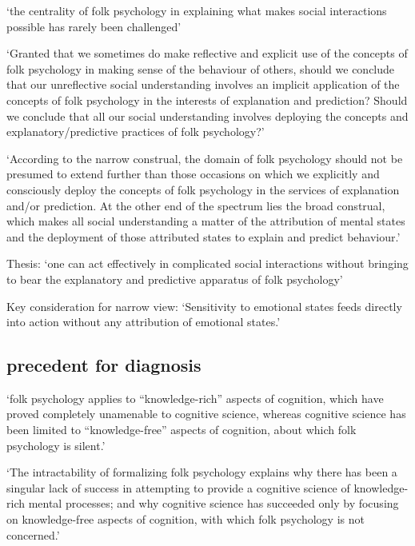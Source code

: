 \documentclass[12pt,\papersize]{extarticle}
\begin{document}
`the centrality of folk psychology in explaining what makes social interactions possible has rarely been challenged' \citep[p.~26]{bermudez:2003_domain}

`Granted that we sometimes do make reflective and explicit use of the concepts of folk psychology in making sense of the behaviour of others, should we conclude that our unreflective social understanding involves an implicit application of the concepts of folk psychology in the interests of explanation and prediction? Should we conclude that all our social understanding involves deploying the concepts and explanatory/predictive practices of folk psychology?' \citep[p.~27]{bermudez:2003_domain}

`According to the narrow construal, the domain of folk psychology should not be presumed to extend further than those occasions on which we explicitly and consciously deploy the concepts of folk psychology in the services of explanation and/or prediction. At the other end of the spectrum lies the broad construal, which makes all social understanding a matter of the attribution of mental states and the deployment of those attributed states to explain and predict behaviour.' \citep[p.~27]{bermudez:2003_domain}

Thesis: `one can act effectively in complicated social interactions without bringing to bear the explanatory and predictive apparatus of folk psychology' \citep[p.~42]{bermudez:2003_domain}

Key consideration for narrow view: `Sensitivity to emotional states feeds directly into action without any attribution of emotional states.' \citep[p.~38]{bermudez:2003_domain}

\hypertarget{precedent-for-diagnosis}{%
\subsection{precedent for diagnosis}\label{precedent-for-diagnosis}}

`folk psychology applies to ``knowledge-rich'' aspects of cognition, which have proved completely unamenable to cognitive science, whereas cognitive science has been limited to ``knowledge-free'' aspects of cognition, about which folk psychology is silent.' \citep[p.~311]{pickering:1995_why}

`The intractability of formalizing folk psychology explains why there has been a singular lack of success in attempting to provide a cognitive science of knowledge-rich mental processes; and why cognitive science has succeeded only by focusing on knowledge-free aspects of cognition, with which folk psychology is not concerned.' \citep[p.~312]{pickering:1995_why}
\end{document}
